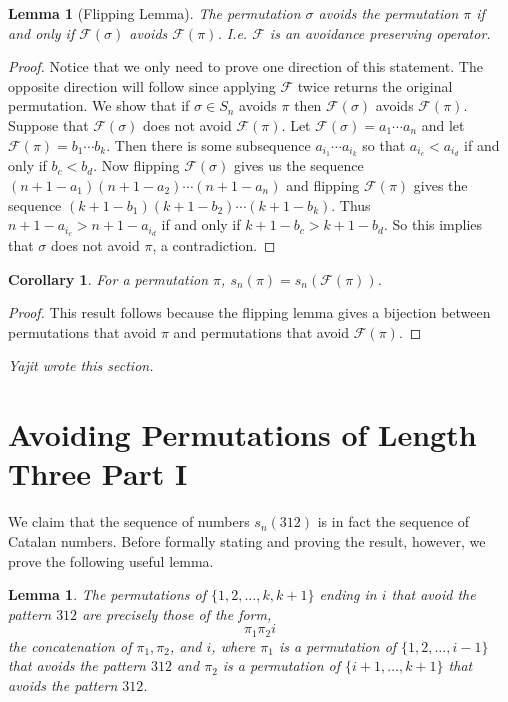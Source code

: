 \documentclass[11pt,letterpaper,twoside,english]{article}
\theoremstyle{theorem}
\newtheorem{corollary}[theorem]{Corollary}
\newtheorem{lemma}[theorem]{Lemma}
\theoremstyle{remark}
\begin{document}
\begin{lemma}[Flipping Lemma]
The permutation $\sigma$ avoids the permutation $\pi$ if and only if $\mathcal{F}(\sigma)$ avoids $\mathcal{F}(\pi)$. I.e. $\mathcal{F}$ is an avoidance preserving operator. 
\end{lemma}
\begin{proof}
Notice that we only need to prove one direction of this statement. The opposite direction will follow since applying $\mathcal{F}$ twice returns the original permutation. We show that if ${\sigma}\in S_n$ avoids $\pi$ then $\mathcal{F}(\sigma)$ avoids $\mathcal{F}(\pi)$. Suppose that $\mathcal{F}(\sigma)$ does not avoid $\mathcal{F}(\pi)$. Let $\mathcal{F}(\sigma)=a_1\cdots a_n$ and let $\mathcal{F}(\pi)=b_1\cdots  b_k$. Then there is some subsequence $a_{i_1}\cdots a_{i_k}$ so that $a_{i_c}<a_{i_d}$ if and only if $b_c<b_d$. Now flipping $\mathcal{F}(\sigma)$ gives us the sequence $(n+1-a_1)(n+1-a_2)\cdots(n+1-a_n)$ and flipping $\mathcal{F}(\pi)$ gives the sequence $(k+1-b_1)(k+1-b_2)\cdots(k+1-b_k)$. Thus $n+1-a_{i_c}>n+1-a_{i_d}$ if and only if $k+1-b_c>k+1-b_d$. So  this implies that $\sigma$ does not avoid $\pi$, a contradiction. 
\end{proof}

\begin{corollary} 
For a permutation $\pi$, $s_n(\pi)=s_n(\mathcal{F}(\pi))$. 
\end{corollary}
\begin{proof}
This result follows because the flipping lemma gives a bijection between permutations that avoid $\pi$ and permutations that avoid $\mathcal{F}(\pi)$. 
\end{proof}

\emph{Yajit wrote this section.}


\section{Avoiding Permutations of Length Three Part I}
\label{312}

We claim that the sequence of numbers $s_n(312)$ is in fact the sequence of Catalan numbers. Before formally stating and proving the result, however, we prove the following useful lemma.
\begin{lemma}
\label{lemma1}
The permutations of $\{1,2,\dots,k,k+1\}$ ending in $i$ that avoid the pattern $312$ are precisely those of the form,
$$\pi_1 \pi_2 i$$
the concatenation of $\pi_1, \pi_2$, and $i$, where $\pi_1$ is a permutation of $\{1,2,\ldots,i-1\}$ that avoids the pattern $312$ and $\pi_2$ is a permutation of $\{i+1,\ldots,k+1\}$ that avoids the pattern $312$.
\end{lemma}
\end{document}

